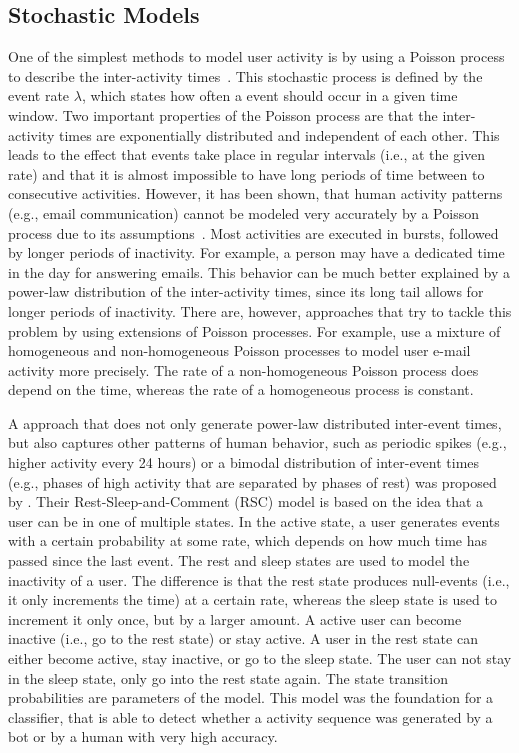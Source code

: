 \subsection{Stochastic Models}

One of the simplest methods to model user activity is by using a Poisson process to describe the inter-activity times~\cite{Barabasi2005, Vazquez2006, Masuda2016}.
This stochastic process is defined by the event rate \( \lambda \), which states how often a event should occur in a given time window.
Two important properties of the Poisson process are that the inter-activity times are exponentially distributed and independent of each other.
This leads to the effect that events take place in regular intervals (i.e., at the given rate) and that it is almost impossible to have long periods of time between to consecutive activities.
However, it has been shown, that human activity patterns (e.g., email communication) cannot be modeled very accurately by a Poisson process due to its assumptions~\cite{Barabasi2005}.
Most activities are executed in bursts, followed by longer periods of inactivity.
For example, a person may have a dedicated time in the day for answering emails.
This behavior can be much better explained by a power-law distribution of the inter-activity times, since its long tail allows for longer periods of inactivity.
There are, however, approaches that try to tackle this problem by using extensions of Poisson processes.
For example, \citet{Malmgren2008} use a mixture of homogeneous and non-homogeneous Poisson processes to model user e-mail activity more precisely.
The rate of a non-homogeneous Poisson process does depend on the time, whereas the rate of a homogeneous process is constant.

A approach that does not only generate power-law distributed inter-event times, but also captures other patterns of human behavior, such as periodic spikes (e.g., higher activity every 24 hours) or a bimodal distribution of inter-event times (e.g., phases of high activity that are separated by phases of rest) was proposed by \citet{Costa2015}.
Their Rest-Sleep-and-Comment (RSC) model is based on the idea that a user can be in one of multiple states.
In the active state, a user generates events with a certain probability at some rate, which depends on how much time has passed since the last event.
The rest and sleep states are used to model the inactivity of a user.
The difference is that the rest state produces null-events (i.e., it only increments the time) at a certain rate, whereas the sleep state is used to increment it only once, but by a larger amount.
A active user can become inactive (i.e., go to the rest state) or stay active.
A user in the rest state can either become active, stay inactive, or go to the sleep state.
The user can not stay in the sleep state, only go into the rest state again.
The state transition probabilities are parameters of the model.
This model was the foundation for a classifier, that is able to detect whether a activity sequence was generated by a bot or by a human with very high accuracy.

